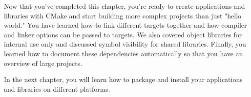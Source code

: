 Now that you've completed this chapter, you're ready to create applications and libraries with CMake and start building more complex projects than just "hello world." You have learned how to link different targets together and how compiler and linker options can be passed to targets. We also covered object libraries for internal use only and discussed symbol visibility for shared libraries. Finally, you learned how to document these dependencies automatically so that you have an overview of large projects.

In the next chapter, you will learn how to package and install your applications and libraries on different platforms.